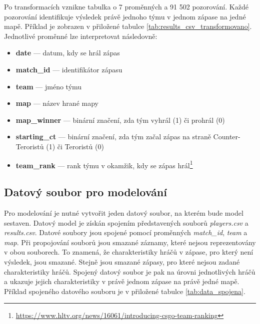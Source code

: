 Po transformacích vznikne tabulka o 7 proměnných a 91 502 pozorování. Každé pozorování identifikuje výsledek právě jednoho týmu v jednom zápase
na jedné mapě. Příklad je zobrazen v přiložené tabulce \ref{tab:results_csv_transformovano}. Jednotlivé proměnné lze interpretovat následovně:
\begin{itemize}
    \item \textbf{date} --- datum, kdy se hrál zápas
    \item \textbf{match\_id} --- identifikátor zápasu
    \item \textbf{team} --- jméno týmu
    \item \textbf{map} --- název hrané mapy
    \item \textbf{map\_winner} --- binární značení, zda tým vyhrál (1) či prohrál (0)
    \item \textbf{starting\_ct} --- binární značení, zda tým začal zápas na straně Counter-Teroristů (1) či Teroristů (0)
    \item \textbf{team\_rank} --- rank týmu v okamžik, kdy se zápas hrál\footnote{\url{https://www.hltv.org/news/16061/introducing-csgo-team-ranking}}
\end{itemize}

\subsection{Datový soubor pro modelování} \label{sec:spojeny_datovy_soubor}
Pro modelování je nutné vytvořit jeden datový soubor, na kterém bude model sestaven. Datový model je získán spojením představených souborů
\textit{players.csv} a \textit{results.csv}. Datové soubory jsou spojené pomocí proměnných \textit{match\_id}, \textit{team} a \textit{map}. Při propojování
souborů jsou smazané záznamy, které nejsou reprezentovány v obou souborech. To znamená, že charakteristiky hráčů v zápase, pro který není výsledek, jsou smazané.
Stejně jsou smazané zápasy, pro které nejsou zadané charakteristiky hráčů. Spojený datový soubor je pak na úrovni jednotlivých hráčů a ukazuje jejich charakteristiky
v právě jednom zápase na právě jedné mapě. Příklad spojeného datového souboru je v přiložené tabulce \ref{tab:data_spojena}.

